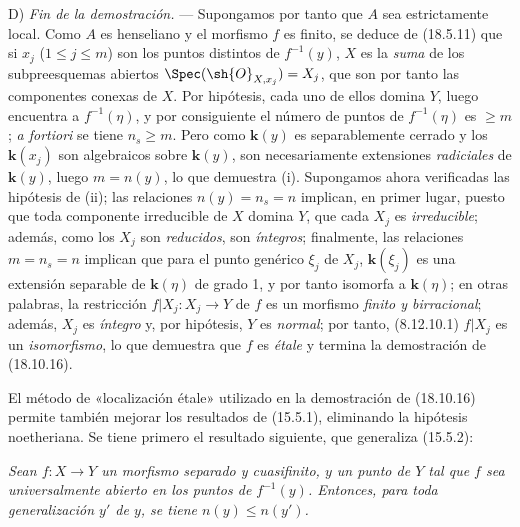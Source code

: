 D) \emph{Fin de la demostración.} --- Supongamos por tanto que $A$ sea estrictamente local. Como $A$ es henseliano y el morfismo $f$ es finito, se deduce de (18.5.11) que si $x_j$ ($1\leq j\leq m$) son los puntos distintos de $f^{-1}(y)$, $X$ es la \emph{suma} de los subpreesquemas abiertos $\Spec(\sh{O}_{X,x_j})=X_j$, que son por tanto las componentes conexas de $X$. Por hipótesis, cada uno de ellos domina $Y$, luego encuentra a $f^{-1}(\eta)$, y por consiguiente el número de puntos de $f^{-1}(\eta)$ es $\geq m$; \emph{a fortiori} se tiene $n_s\geq m$. Pero como $\boldsymbol{k}(y)$ es separablemente cerrado y los $\boldsymbol{k}(x_j)$ son algebraicos sobre $\boldsymbol{k}(y)$, son necesariamente extensiones \emph{radiciales} de $\boldsymbol{k}(y)$, luego $m=n(y)$, lo que demuestra (i). Supongamos ahora verificadas las hipótesis de (ii); las relaciones $n(y)=n_s=n$ implican, en primer lugar, puesto que toda componente irreducible de $X$ domina $Y$, que cada $X_j$ es \emph{irreducible}; además, como los $X_j$ son \emph{reducidos}, son \emph{íntegros}; finalmente, las relaciones $m=n_s=n$ implican que para el punto genérico $\xi_j$ de $X_j$, $\boldsymbol{k}(\xi_j)$ es una extensión separable de $\boldsymbol{k}(\eta)$ de grado 1, y por tanto isomorfa a $\boldsymbol{k}(\eta)$; en otras palabras, la restricción $f|X_j:X_j\to Y$ de $f$ es un morfismo \emph{finito y birracional}; además, $X_j$ es \emph{íntegro} y, por hipótesis, $Y$ es \emph{normal}; por tanto, (8.12.10.1) $f|X_j$ es un \emph{isomorfismo}, lo que demuestra que $f$ es \emph{étale} y termina la demostración de (18.10.16).

\begin{remark}[18.10.17]
\label{IV.18.10.17}
El método de «localización étale» utilizado en la demostración de (18.10.16) permite también mejorar los resultados de (15.5.1), eliminando la hipótesis noetheriana. Se tiene primero el resultado siguiente, que generaliza (15.5.2):
\end{remark}

\begin{env}[18.10.17.1]
\label{IV.18.10.17.1}
\emph{Sean $f:X\to Y$ un morfismo separado y cuasifinito, $y$ un punto de $Y$ tal que $f$ sea universalmente abierto en los puntos de $f^{-1}(y)$. Entonces, para toda generalización $y'$ de $y$, se tiene $n(y)\leq n(y')$.}
\end{env}

